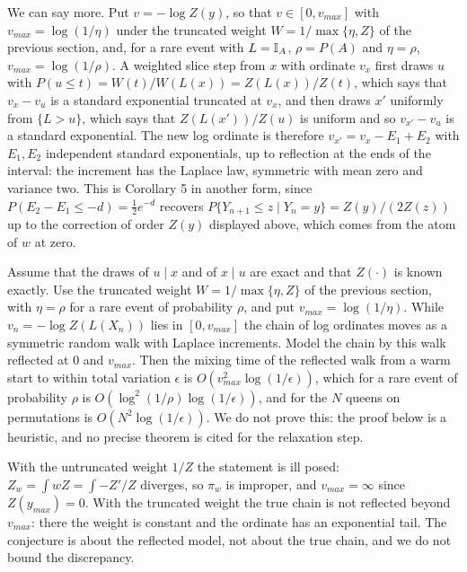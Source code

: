 We can say more. Put $v = -\log Z(y)$, so that $v \in [0, v_{max}]$ with $v_{max} = \log(1/\eta)$ under the truncated weight $W = 1/\max\{\eta, Z\}$ of the previous section, and, for a rare event with $L = \mathbb{I}_A$, $\rho = P(A)$ and $\eta = \rho$, $v_{max} = \log(1/\rho)$. A weighted slice step from $x$ with ordinate $v_x$ first draws $u$ with $P(u \le t) = W(t)/W(L(x)) = Z(L(x))/Z(t)$, which says that $v_x - v_u$ is a standard exponential truncated at $v_x$, and then draws $x'$ uniformly from $\{ L > u \}$, which says that $Z(L(x'))/Z(u)$ is uniform and so $v_{x'} - v_u$ is a standard exponential. The new log ordinate is therefore $v_{x'} = v_x - E_1 + E_2$ with $E_1, E_2$ independent standard exponentials, up to reflection at the ends of the interval: the increment has the Laplace law, symmetric with mean zero and variance two. This is Corollary 5 in another form, since $P(E_2 - E_1 \le -d) = \tfrac12 e^{-d}$ recovers $P\{ Y_{n+1} \le z \mid Y_n = y \} = Z(y) / (2 Z(z))$ up to the correction of order $Z(y)$ displayed above, which comes from the atom of $w$ at zero.

\begin{conjecture}
\label{conj:reflectedmix}
Assume that the draws of $u \mid x$ and of $x \mid u$ are exact and that $Z(\cdot)$ is known exactly. Use the truncated weight $W = 1/\max\{\eta, Z\}$ of the previous section, with $\eta = \rho$ for a rare event of probability $\rho$, and put $v_{max} = \log(1/\eta)$. While $v_n = -\log Z(L(X_n))$ lies in $[0, v_{max}]$ the chain of log ordinates moves as a symmetric random walk with Laplace increments. Model the chain by this walk reflected at $0$ and $v_{max}$. Then the mixing time of the reflected walk from a warm start to within total variation $\epsilon$ is $O( v_{max}^2 \log(1/\epsilon) )$, which for a rare event of probability $\rho$ is $O( \log^2(1/\rho) \log(1/\epsilon) )$, and for the $N$ queens on permutations is $O( N^2 \log(1/\epsilon) )$. We do not prove this: the proof below is a heuristic, and no precise theorem is cited for the relaxation step.
\end{conjecture}

With the untruncated weight $1/Z$ the statement is ill posed: $Z_w = \int w Z = \int -Z'/Z$ diverges, so $\pi_w$ is improper, and $v_{max} = \infty$ since $Z(y_{max}) = 0$. With the truncated weight the true chain is not reflected beyond $v_{max}$: there the weight is constant and the ordinate has an exponential tail. The conjecture is about the reflected model, not about the true chain, and we do not bound the discrepancy.

